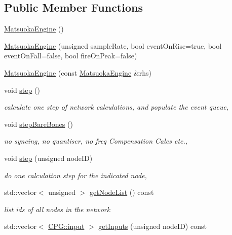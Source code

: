 \subsection*{Public Member Functions}
\begin{DoxyCompactItemize}
\item 
\mbox{\hyperlink{classMatsuokaEngine_a25f70ceddea44651433ea8547b332ecf}{Matsuoka\+Engine}} ()
\item 
\mbox{\hyperlink{classMatsuokaEngine_a4d26cc1bf5144ea89611377701716fea}{Matsuoka\+Engine}} (unsigned sample\+Rate, bool event\+On\+Rise=true, bool event\+On\+Fall=false, bool fire\+On\+Peak=false)
\item 
\mbox{\hyperlink{classMatsuokaEngine_ab0c8d7fd6eb27c8a8dae7e5fa3742ff9}{Matsuoka\+Engine}} (const \mbox{\hyperlink{classMatsuokaEngine}{Matsuoka\+Engine}} \&rhs)
\item 
void \mbox{\hyperlink{classMatsuokaEngine_a4fa468dc0814f1ad92594f7a4d5abd00}{step}} ()
\begin{DoxyCompactList}\small\item\em calculate one step of network calculations, and populate the event queue, \end{DoxyCompactList}\item 
void \mbox{\hyperlink{classMatsuokaEngine_a12519e69a1b16fe9c07717ded5249cdf}{step\+Bare\+Bones}} ()
\begin{DoxyCompactList}\small\item\em no syncing, no quantiser, no freq Compensation Calcs etc., \end{DoxyCompactList}\item 
void \mbox{\hyperlink{classMatsuokaEngine_aedf2583d11befa98a8a9d74c700635d6}{step}} (unsigned node\+ID)
\begin{DoxyCompactList}\small\item\em do one calculation step for the indicated node, \end{DoxyCompactList}\item 
std\+::vector$<$ unsigned $>$ \mbox{\hyperlink{classMatsuokaEngine_ae8f070a75e9005f6cc1f3c2b33c4baf5}{get\+Node\+List}} () const
\begin{DoxyCompactList}\small\item\em list ids of all nodes in the network \end{DoxyCompactList}\item 
std\+::vector$<$ \mbox{\hyperlink{structCPG_1_1input}{C\+P\+G\+::input}} $>$ \mbox{\hyperlink{classMatsuokaEngine_a7b8067a4f72a8376635ce2d61bece1f2}{get\+Inputs}} (unsigned node\+ID) const

\end{DoxyCompactItemize}
